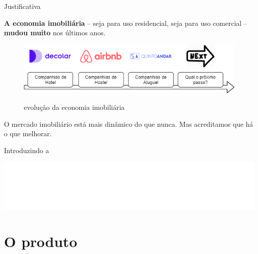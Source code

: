 \documentclass[10pt]{beamer}
\begin{document}
\begin{frame}[fragile]{Justificativa}

    \textbf{A economia imobiliária} -- seja para uso residencial, seja para uso comercial -- \textbf{mudou muito} nos últimos anos.
    
    \begin{figure}
        \centering
        \caption{evolução da economia imobiliária}
        \includegraphics[width=\linewidth]{demo/images/evolucao_imobiliaria.png}
        \label{fig:noticia2}
    \end{figure}
    
    \begin{block}{O mercado imobiliário está mais dinâmico do que nunca.}
        \alert{Mas acreditamos que há o que melhorar.}
    \end{block}
    
\end{frame}

\begin{frame}[standout]
  \begin{center}
      Introduzindo a
      
      \includegraphics[height=.1\linewidth]{demo/images/realoque.png}
  \end{center}
\end{frame}

\section{O produto}
\end{document}
